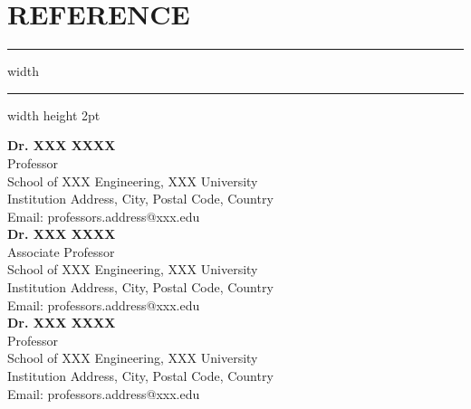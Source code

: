 \documentclass[12pt]{article}
\begin{document}
	\vspace{-4mm}
	\section*{\textbf{\Large R}\normalsize EFERENCE}
	\vspace{-2mm}
	\hrule width \hsize \kern 1mm \hrule width \hsize height 2pt
	\vspace{2mm}
	\begin{flushleft}
        \textbf{Dr. XXX XXXX}\\
		\hspace{5pt}Professor\\
		\hspace{5pt}School of XXX Engineering, XXX University\\
		\hspace{5pt}Institution Address, City, Postal Code, Country\\
		\hspace{5pt}Email: professors.address@xxx.edu\\

        \textbf{Dr. XXX XXXX}\\
		\hspace{5pt}Associate Professor\\
		\hspace{5pt}School of XXX Engineering, XXX University\\
		\hspace{5pt}Institution Address, City, Postal Code, Country\\
		\hspace{5pt}Email: professors.address@xxx.edu\\

        \textbf{Dr. XXX XXXX}\\
		\hspace{5pt}Professor\\
		\hspace{5pt}School of XXX Engineering, XXX University\\
		\hspace{5pt}Institution Address, City, Postal Code, Country\\
		\hspace{5pt}Email: professors.address@xxx.edu\\


	\end{flushleft}
\end{document}
